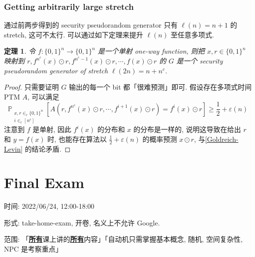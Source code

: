 \documentclass[8pt]{article}
\theoremstyle{compact}
\newtheorem{theorem}{定理}[section]
\def\obj#1{\textbf{\uline{#1}}}
\def\ge{\geqslant}
\begin{document}
\subsubsection{Getting arbitrarily large stretch}

通过前两步得到的 security pseudorandom generator 只有 $\ell(n) = n + 1$ 的 stretch, 这可不太行. 可以通过如下定理来提升 $\ell(n)$ 至任意多项式.

\begin{theorem}
	令 $f: \{0, 1\}^n \to \{0, 1\}^n$ 是一个单射 one-way function, 则把 $x, r \in \{0, 1\}^n$ 映射到 $r, f^{n^c}(x) \odot r, f^{n^c-1}(x) \odot r, \cdots, f(x) \odot r$ 的 $G$ 是一个 security pseudorandom generator of stretch $\ell(2n) = n + n^c$.
\end{theorem}
\begin{proof}
	只需要证明 $G$ 输出的每一个 bit 都「很难预测」即可. 假设存在多项式时间 PTM $A$, 可以满足 $$\mathbb P_{\substack{x, r \in_r \{0, 1\}^n \\ i \in_r [n^c]}}[A(r, f^{n^c}(x) \odot r, \cdots, f^{i+1}(x)\odot r) = f^i(x) \odot r] \ge \frac12 + \varepsilon(n)$$ 注意到 $f$ 是单射, 因此 $f^i(x)$ 的分布和 $x$ 的分布是一样的, 说明这导致在给出 $r$ 和 $y = f(x)$ 时, 也能存在算法以 $\frac12 + \varepsilon(n)$ 的概率预测 $x \odot r$, 与\cref{Goldreich-Levin} 的结论矛盾.
\end{proof}

\newpage
\section{Final Exam}
时间: 2022/06/24, 12:00-18:00

形式: take-home-exam, 开卷, 名义上不允许 Google.

范围: 「\obj{所有}课上讲的\obj{所有}内容」「自动机只需掌握基本概念, 随机, 空间复杂性, NPC 是考察重点」
\end{document}
